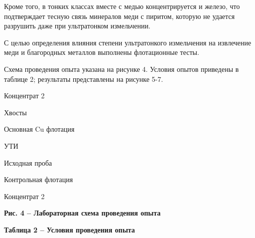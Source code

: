 Кроме того, в тонких классах вместе с медью концентрируется и железо,
что подтверждает тесную связь минералов меди с пиритом, которую не
удается разрушить даже при ультратонком измельчении.

С целью определения влияния степени ультратонкого измельчения на
извлечение меди и благородных металлов выполнены флотационные тесты.

Схема проведения опыта указана на рисунке 4. Условия опытов приведены в
таблице 2; результаты представлены на рисунке 5-7.

Концентрат 2

Хвосты

Основная Cu флотация

УТИ

Исходная проба

Контрольная флотация

Концентрат 2

{\bfseries Рис. 4 -- Лабораторная схема проведения опыта}

{\bfseries Таблица 2 -- Условия проведения опыта}

